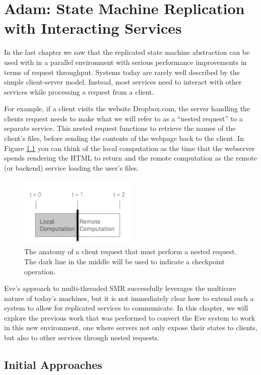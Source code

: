 \documentclass[11pt, oneside]{report}
\begin{document}
\chapter{Adam: State Machine Replication with Interacting Services}\label{Adam}

In the last chapter we saw that the replicated state machine abstraction can be used with in a parallel environment with serious performance improvements in terms of request throughput. 
Systems today are rarely well described by the simple client-server model.
Instead, most services need to interact with other services while processing a request from a client. 

For example, if a client visits the website Dropbox.com, the server handling the clients request needs to make what we will refer to as a ``nested request'' to a separate service. This nested request functions to retrieve the names of the client's files, before sending the contents of the webpage back to the client. In Figure \ref{anatomy} you can think of the local computation as the time that the webserver spends rendering the HTML to return and the remote computation as the remote (or backend) service loading the user's files.

\begin{figure}[h]
\centering
\includegraphics[width=0.5\textwidth]{RequestAnatomy.png}
\caption{\label{anatomy}The anatomy of a client request that must perform a nested request. The dark line in the middle will be used to indicate a checkpoint operation.}
\end{figure}

Eve's approach to multi-threaded SMR successfully leverages the multicore nature of today's machines, but it is not immediately clear how to extend such a system to allow for replicated services to communicate. 
In this chapter, we will explore the previous work that was performed to convert the Eve system to work in this new environment, one where servers not only expose their states to clients, but also to other services through nested requests.

\section{Initial Approaches}
\end{document}
